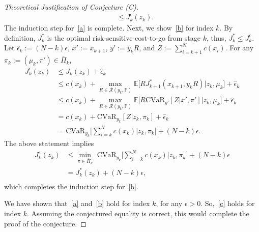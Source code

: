 \documentclass[letterpaper, 10 pt, conference]{ieeeconf}  %
\newcommand{\mpc}[1]{{\color{cyan} #1}}
\newcommand{\mpc}[1]{#1}
\begin{document}
\begin{proof}[Theoretical Justification of Conjecture (C)]
\begin{equation*}
\begin{aligned}
& \leq J_k^\epsilon(z_k). \end{aligned}\end{equation*}
%
The induction step for~\eqref{a} is complete. Next, we show~\eqref{b} for index $k$. By definition, $J_k^*$ is the optimal risk-sensitive cost-to-go from stage $k$, thus, $J_k^* \leq J_k^\epsilon$.
Let $\hat{\epsilon}_k := (N-k)\epsilon$, $x':=x_{k+1}$, $y' := y_kR$, and $Z := \sum_{i=k+1}^N c(x_i)$. For any $\pi_k := (\mu_k, \pi') \in \bar{\Pi}_k$,
%
\begin{equation*}\begin{aligned}
J_k^\epsilon(z_k) & \leq J_k(z_k) + \hat{\epsilon}_k \\
& \leq c(x_k) + {\underset{R \in \mathcal{R}(y_k, \mathbb{P})}\max} \mathbb{E}\big[ RJ_{k+1}^*(x_{k+1},y_kR) \big| z_k, \mu_k \big] + \hat{\epsilon}_k\\
& \leq c(x_k) + {\underset{R \in \mathcal{R}(y_k, \mathbb{P})}\max} \mathbb{E}\big[ R\text{CVaR}_{y'} [Z|x', \pi' ] \big| z_k, \mu_k \big] + \hat{\epsilon}_k\\
& = c(x_k) + \text{CVaR}_{y_k}[Z|z_k, \pi_k] + \hat{\epsilon}_k\\
& = \text{CVaR}_{y_k}\big[\textstyle \sum_{i=k}^N c(x_k)|z_k, \pi_k\big] + (N-k)\epsilon.
\end{aligned}\end{equation*}
%
The above statement implies
%
\begin{equation*}\begin{aligned}
J_k^\epsilon(z_k) & \leq {\underset{\pi \in \bar{\Pi}_k} \min} \text{ CVaR}_{y_k}\big[\textstyle \sum_{i=k}^N c(x_k)|z_k, \pi_k\big] + (N-k)\epsilon \\
& = J_k^*(z_k) + (N-k)\epsilon, \\
\end{aligned}\end{equation*}
%
which completes the induction step for~\eqref{b}. 

We have shown that~\eqref{a} and~\eqref{b} hold for index $k$, for any $\epsilon>0$. So,~\eqref{c} holds for index $k$. 
\mpc{Assuming the conjectured equality is correct, this would complete the proof of the conjecture}.
\end{proof}
\addtolength{\textheight}{-2cm}   %


\end{document}
